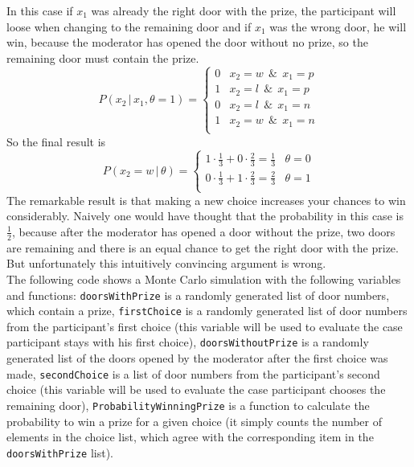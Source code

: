 \documentclass{tstextbook}
\begin{document}
\begin{example}
In this case if $x_1$ was already the right door with the prize, the participant will loose when changing to the remaining door and if $x_1$ was the wrong door, he will win, because the moderator has opened the door without no prize, so the remaining door must contain the prize.
  \begin{equation}
   P(x_2\,\vert\,x_1,\theta=1)=
\begin{cases}
0 & x_2=w\:\ \&\:\ x_1=p \\
1 & x_2=l\:\ \&\:\ x_1=p \\
0 & x_2=l\:\ \&\:\ x_1=n \\
1 & x_2=w\:\ \&\:\ x_1=n \\
\end{cases}                    
  \end{equation}
So the final result is
  \begin{equation}
   P(x_2=w\,\vert\,\theta)=
\begin{cases}
1\cdot\frac{1}{3}+0\cdot\frac{2}{3}=\frac{1}{3} & \theta=0 \\
0\cdot\frac{1}{3}+1\cdot\frac{2}{3}=\frac{2}{3} & \theta=1 \\
\end{cases}
  \end{equation}  
The remarkable result is that making a new choice increases your chances to win considerably. Naively one would have thought that the probability in this case is $\frac{1}{2}$, because after the moderator has opened a door without the prize, two doors are remaining and there is an equal chance to get the right door with the prize. But unfortunately this intuitively convincing argument is wrong.\\

The following code shows a Monte Carlo simulation with the following variables and functions:
\texttt{doorsWithPrize} is a randomly generated list of door numbers, which contain a prize,
\texttt{firstChoice} is a randomly generated list of door numbers from the participant's first choice (this variable will be used to evaluate the case participant stays with his first choice),
\texttt{doorsWithoutPrize} is a randomly generated list of the doors opened by the moderator after the first choice was made,
\texttt{secondChoice} is a list of door numbers from the participant's second choice (this variable will be used to evaluate the case participant chooses the remaining door),
\texttt{ProbabilityWinningPrize} is a function to calculate the probability to win a prize for a given choice (it simply counts the number of elements in the choice list, which agree with the corresponding item in the \texttt{doorsWithPrize} list). 
\\   


\end{example}
\end{document}
